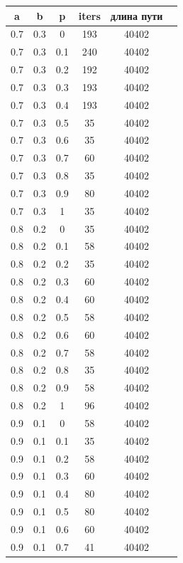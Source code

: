 \documentclass[a4paper,12pt]{article}
\begin{document}
\begin{table}
\begin{minipage}[!h]{0.50\hsize}
\begin{center}
\begin{tabular}{c@{\hspace{7mm}}c@{\hspace{7mm}}c@{\hspace{7mm}}c@{\hspace{7mm}}c@{\hspace{7mm}}c}
			\toprule
			a        &b      &p      &iters &длина пути \\
			\midrule
			0.7     &0.3    &0      &193   &40402\\
			0.7     &0.3    &0.1    &240   &40402\\
			0.7     &0.3    &0.2    &192   &40402\\
			0.7     &0.3    &0.3    &193   &40402\\
			0.7     &0.3    &0.4    &193   &40402\\
			0.7     &0.3    &0.5    &35    &40402\\
			0.7     &0.3    &0.6    &35    &40402\\
			0.7     &0.3    &0.7    &60    &40402\\
			0.7     &0.3    &0.8    &35    &40402\\
			0.7     &0.3    &0.9    &80    &40402\\
			0.7     &0.3    &1      &35    &40402\\
			\midrule
			0.8     &0.2    &0      &35    &40402\\
			0.8     &0.2    &0.1    &58    &40402\\
			0.8     &0.2    &0.2    &35    &40402\\
			0.8     &0.2    &0.3    &60    &40402\\
			0.8     &0.2    &0.4    &60    &40402\\
			0.8     &0.2    &0.5    &58    &40402\\
			0.8     &0.2    &0.6    &60    &40402\\
			0.8     &0.2    &0.7    &58    &40402\\
			0.8     &0.2    &0.8    &35    &40402\\
			0.8     &0.2    &0.9    &58    &40402\\
			0.8     &0.2    &1      &96    &40402\\
			\midrule
			0.9     &0.1    &0      &58    &40402\\
			0.9     &0.1    &0.1    &35    &40402\\
			0.9     &0.1    &0.2    &58    &40402\\
			0.9     &0.1    &0.3    &60    &40402\\
			0.9     &0.1    &0.4    &80    &40402\\
			0.9     &0.1    &0.5    &80    &40402\\
			0.9     &0.1    &0.6    &60    &40402\\
			0.9     &0.1    &0.7    &41    &40402\\

\end{tabular}
\end{center}
\end{minipage}
\end{table}
\end{document}
